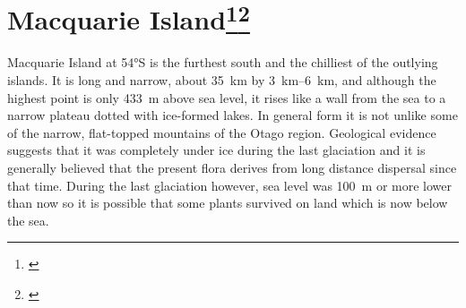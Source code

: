 \section[Macquarie Island]{Macquarie Island\thinspace\footnote{\cite{taylor1955flora}}\footnote{\cite{seppelt1984vascular}}}

Macquarie Island at \ang{54}S is the furthest south and the chilliest of the outlying islands.
It is long and narrow, about \SI{35}{\kilo\metre} by \SIrange{3}{6}{\kilo\metre}, and although the highest point is only \SI{433}{\metre} above sea level, it rises like a wall from the sea to a narrow plateau dotted with ice-formed lakes.
In general form it is not unlike some of the narrow, flat-topped mountains of the Otago region.
Geological evidence suggests that it was completely under ice during the last glaciation and it is generally believed that the present flora derives from long distance dispersal since that time.
During the last glaciation however, sea level was \SI{100}{\metre} or more lower than now so it is possible that some plants survived on land which is now below the sea.


